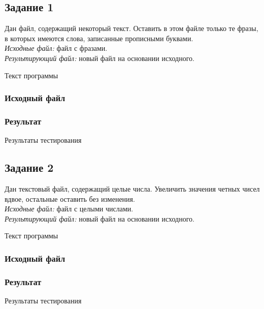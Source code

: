 \documentclass[a4paper,14pt]{extarticle}
\begin{document}
\subsection{Задание 1}
Дан файл, содержащий некоторый текст. Оставить в этом файле только те фразы, в которых имеются слова, записанные прописными буквами.\\
\textit{Исходные файл:} файл с фразами.\\
\textit{Результирующий файл:} новый файл на основании исходного.\\

\begin{center}
  Текст программы
\end{center}
\vspace{0.6cm}
\subsubsection{Исходный файл}

\subsubsection{Результат}

\vspace{0.3cm}
\begin{center}
  Результаты тестирования
\end{center}

\subsection{Задание 2}
Дан текстовый файл, содержащий целые числа. Увеличить значения четных чисел вдвое, остальные оставить без изменения.\\
\textit{Исходные файл:} файл с целыми числами.\\
\textit{Результирующий файл:} новый файл на основании исходного.\\

\begin{center}
Текст программы
\end{center}
\vspace{0.6cm}
\subsubsection{Исходный файл}

\subsubsection{Результат}

\vspace{0.3cm}
\begin{center}
  Результаты тестирования
\end{center}
\end{document}
